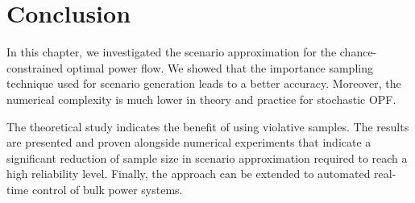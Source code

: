 \section{Conclusion}
\label{sec:conclusion-dc}
In this chapter, we investigated the scenario approximation for the chance-constrained optimal power flow. We showed that the importance sampling technique used for scenario generation leads to a better accuracy. Moreover, the numerical complexity is much lower in theory and practice for stochastic OPF. 

The theoretical study indicates the benefit of using violative samples. The results are presented and proven alongside numerical experiments that indicate a significant reduction of sample size in scenario approximation required to reach a high reliability level. Finally, the approach can be extended to automated real-time control of bulk power systems. 